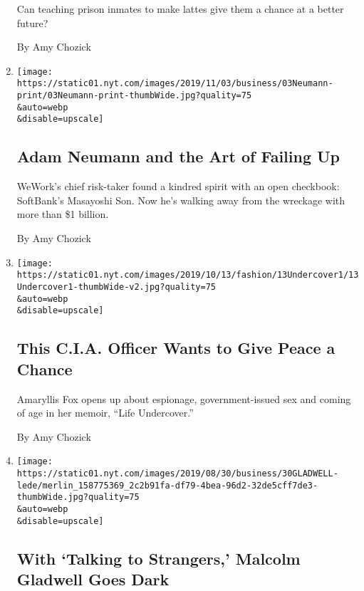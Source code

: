 \begin{enumerate}
  Can teaching prison inmates to make lattes give them a chance at a
  better future?

  By Amy Chozick
\item
  \href{/2019/11/02/business/adam-neumann-wework-exit-package.html}{}

  \texttt{[image: https://static01.nyt.com/images/2019/11/03/business/03Neumann-print/03Neumann-print-thumbWide.jpg?quality=75\\\&auto=webp\\\&disable=upscale]}

  \hypertarget{adam-neumann-and-the-art-of-failing-up}{%
  \subsection{Adam Neumann and the Art of Failing
  Up}\label{adam-neumann-and-the-art-of-failing-up}}

  WeWork's chief risk-taker found a kindred spirit with an open
  checkbook: SoftBank's Masayoshi Son. Now he's walking away from the
  wreckage with more than \$1 billion.

  By Amy Chozick
\item
  \href{/2019/10/10/books/amaryllis-fox-life-undercover-cia.html}{}

  \texttt{[image: https://static01.nyt.com/images/2019/10/13/fashion/13Undercover1/13Undercover1-thumbWide-v2.jpg?quality=75\\\&auto=webp\\\&disable=upscale]}

  \hypertarget{this-cia-officer-wants-to-give-peace-a-chance}{%
  \subsection{This C.I.A. Officer Wants to Give Peace a
  Chance}\label{this-cia-officer-wants-to-give-peace-a-chance}}

  Amaryllis Fox opens up about espionage, government-issued sex and
  coming of age in her memoir, ``Life Undercover.''

  By Amy Chozick
\item
  \href{/2019/08/30/business/malcolm-gladwell-talking-to-strangers.html}{}

  \texttt{[image: https://static01.nyt.com/images/2019/08/30/business/30GLADWELL-lede/merlin\_158775369\_2c2b91fa-df79-4bea-96d2-32de5cff7de3-thumbWide.jpg?quality=75\\\&auto=webp\\\&disable=upscale]}

  \hypertarget{with-talking-to-strangers-malcolm-gladwell-goes-dark}{%
  \subsection{With `Talking to Strangers,' Malcolm Gladwell Goes
  Dark}\label{with-talking-to-strangers-malcolm-gladwell-goes-dark}}


\end{enumerate}

